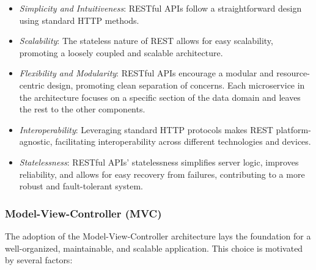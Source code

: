 \begin{itemize}
    \item \textit{Simplicity and Intuitiveness}: RESTful APIs follow a straightforward design using standard HTTP methods.
  
    \item \textit{Scalability}: The stateless nature of REST allows for easy scalability, promoting a loosely coupled and scalable architecture.
  
    \item \textit{Flexibility and Modularity}: RESTful APIs encourage a modular and resource-centric design, promoting clean separation of concerns. Each microservice in the architecture focuses on a specific section of the data domain and leaves the rest to the other components.
  
    \item \textit{Interoperability}: Leveraging standard HTTP protocols makes REST platform-agnostic, facilitating interoperability across different technologies and devices.
  
    \item \textit{Statelessness}: RESTful APIs' statelessness simplifies server logic, improves reliability, and allows for easy recovery from failures, contributing to a more robust and fault-tolerant system.
\end{itemize}

\subsubsection*{Model-View-Controller (MVC)}

The adoption of the Model-View-Controller architecture lays the foundation for a well-organized, maintainable, and scalable application. This choice is motivated by several factors:

